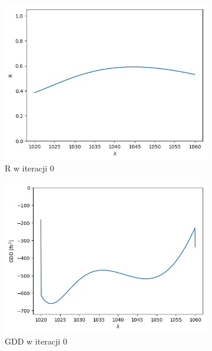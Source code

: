 \begin{figure} [ht!]
    \centering
    \begin{subfigure}[b]{0.30\textwidth}
        \includegraphics[width=\linewidth]{figures/wyniki/1stopien/fcelptp/result_R0.png}
        \caption{R w iteracji 0}
    \end{subfigure}
            \begin{subfigure}[b]{0.31\textwidth}
        \includegraphics[width=\linewidth]{figures/wyniki/1stopien/fcelptp/result_gdd0.png}
        \caption{GDD w iteracji 0}
    \end{subfigure}
        \begin{subfigure}[b]{0.32\textwidth}

\end{subfigure}
\end{figure}
